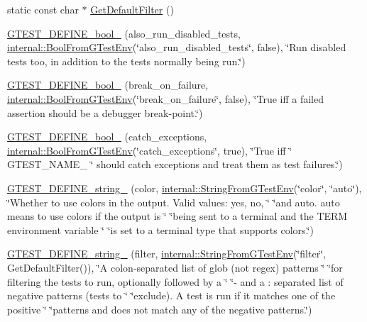 \begin{DoxyCompactItemize}
\item 
static const char $\ast$ \mbox{\hyperlink{namespacetesting_a56fbc164c7dc53596c23e519d8f1ca3c}{Get\+Default\+Filter}} ()
\item 
\mbox{\hyperlink{namespacetesting_ad72f215c805a46fba44cb09d717b01ef}{G\+T\+E\+S\+T\+\_\+\+D\+E\+F\+I\+N\+E\+\_\+bool\+\_\+}} (also\+\_\+run\+\_\+disabled\+\_\+tests, \mbox{\hyperlink{namespacetesting_1_1internal_a67132cdce23fb71b6c38ee34ef81eb4c}{internal\+::\+Bool\+From\+G\+Test\+Env}}(\char`\"{}also\+\_\+run\+\_\+disabled\+\_\+tests\char`\"{}, false), \char`\"{}Run disabled tests too, in addition to the tests normally being run.\char`\"{})
\item 
\mbox{\hyperlink{namespacetesting_a5ab9e9cc2ee1addddfb2f4b43dd4e402}{G\+T\+E\+S\+T\+\_\+\+D\+E\+F\+I\+N\+E\+\_\+bool\+\_\+}} (break\+\_\+on\+\_\+failure, \mbox{\hyperlink{namespacetesting_1_1internal_a67132cdce23fb71b6c38ee34ef81eb4c}{internal\+::\+Bool\+From\+G\+Test\+Env}}(\char`\"{}break\+\_\+on\+\_\+failure\char`\"{}, false), \char`\"{}True iff a failed assertion should be a debugger break-\/point.\char`\"{})
\item 
\mbox{\hyperlink{namespacetesting_a96c82869676822ec883043aefb6dd042}{G\+T\+E\+S\+T\+\_\+\+D\+E\+F\+I\+N\+E\+\_\+bool\+\_\+}} (catch\+\_\+exceptions, \mbox{\hyperlink{namespacetesting_1_1internal_a67132cdce23fb71b6c38ee34ef81eb4c}{internal\+::\+Bool\+From\+G\+Test\+Env}}(\char`\"{}catch\+\_\+exceptions\char`\"{}, true), \char`\"{}True iff \char`\"{} G\+T\+E\+S\+T\+\_\+\+N\+A\+M\+E\+\_\+ \char`\"{} should catch exceptions and treat them as test failures.\char`\"{})
\item 
\mbox{\hyperlink{namespacetesting_a32f0280e95e7718835b0e3d2f7277269}{G\+T\+E\+S\+T\+\_\+\+D\+E\+F\+I\+N\+E\+\_\+string\+\_\+}} (color, \mbox{\hyperlink{namespacetesting_1_1internal_a7ed785df46a339403b0f749d3a879201}{internal\+::\+String\+From\+G\+Test\+Env}}(\char`\"{}color\char`\"{}, \char`\"{}auto\char`\"{}), \char`\"{}Whether to use colors in the output.  Valid values\+: yes, no, \char`\"{} \char`\"{}and auto.  \textquotesingle{}auto\textquotesingle{} means to use colors if the output is \char`\"{} \char`\"{}being sent to a terminal and the T\+E\+RM environment variable \char`\"{} \char`\"{}is set to a terminal type that supports colors.\char`\"{})
\item 
\mbox{\hyperlink{namespacetesting_a2830ee1f2237233fa44aa580c5a919ce}{G\+T\+E\+S\+T\+\_\+\+D\+E\+F\+I\+N\+E\+\_\+string\+\_\+}} (filter, \mbox{\hyperlink{namespacetesting_1_1internal_a7ed785df46a339403b0f749d3a879201}{internal\+::\+String\+From\+G\+Test\+Env}}(\char`\"{}filter\char`\"{}, Get\+Default\+Filter()), \char`\"{}A colon-\/separated list of glob (not regex) patterns \char`\"{} \char`\"{}for filtering the tests to run, optionally followed by a \char`\"{} \char`\"{}\textquotesingle{}-\/\textquotesingle{} and a \+: separated list of negative patterns (tests to \char`\"{} \char`\"{}exclude).  A test is run if it matches one of the positive \char`\"{} \char`\"{}patterns and does not match any of the negative patterns.\char`\"{})

\end{DoxyCompactItemize}

